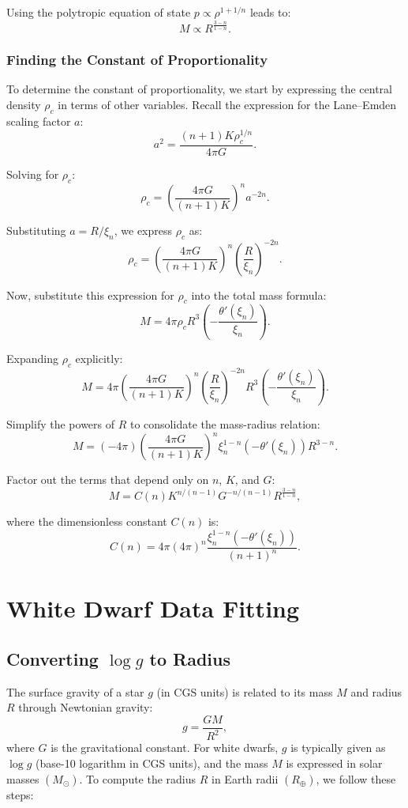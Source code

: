 \documentclass[12pt]{article}
\begin{document}
Using the polytropic equation of state \(p \propto \rho^{1 + 1/n}\) leads to:
\[
M \propto R^{\frac{3 - n}{1 - n}}.
\]


\subsubsection{Finding the Constant of Proportionality}

To determine the constant of proportionality, we start by expressing the central density \(\rho_c\) in terms of other variables. Recall the expression for the Lane–Emden scaling factor \(a\):
\[
a^2 = \frac{(n+1)K\rho_c^{1/n}}{4\pi G}.
\]

Solving for \(\rho_c\):
\[
\rho_c = \left(\frac{4\pi G}{(n+1)K}\right)^n a^{-2n}.
\]

Substituting \(a = R / \xi_n\), we express \(\rho_c\) as:
\[
\rho_c = \left(\frac{4\pi G}{(n+1)K}\right)^n \left(\frac{R}{\xi_n}\right)^{-2n}.
\]

Now, substitute this expression for \(\rho_c\) into the total mass formula:
\[
M = 4\pi \rho_c R^3 \left(-\frac{\theta'(\xi_n)}{\xi_n}\right).
\]

Expanding \(\rho_c\) explicitly:
\[
M = 4\pi \left(\frac{4\pi G}{(n+1)K}\right)^n \left(\frac{R}{\xi_n}\right)^{-2n} R^3 \left(-\frac{\theta'(\xi_n)}{\xi_n}\right).
\]

Simplify the powers of \(R\) to consolidate the mass-radius relation:
\[
M = \left(-4\pi \right) \left(\frac{4\pi G}{(n+1)K}\right)^n \xi_n^{1-n} \left(-\theta'(\xi_n)\right) R^{3-n}.
\]

Factor out the terms that depend only on \(n\), \(K\), and \(G\):
\[
M = C(n) K^{n/(n-1)} G^{-n/(n-1)} R^{\frac{3-n}{1-n}},
\]

where the dimensionless constant \(C(n)\) is:
\[
C(n) = 4\pi \left(4\pi\right)^n \frac{\xi_n^{1-n} \left(-\theta'(\xi_n)\right)}{(n+1)^n}.
\]

\section{White Dwarf Data Fitting}

\subsection{Converting \(\log g\) to Radius}

The surface gravity of a star \(g\) (in CGS units) is related to its mass \(M\) and radius \(R\) through Newtonian gravity:
\[
g = \frac{G M}{R^2},
\]
where \(G\) is the gravitational constant. For white dwarfs, \(g\) is typically given as \(\log g\) (base-10 logarithm in CGS units), and the mass \(M\) is expressed in solar masses \((M_\odot)\). To compute the radius \(R\) in Earth radii \((R_\oplus)\), we follow these steps:
\end{document}
